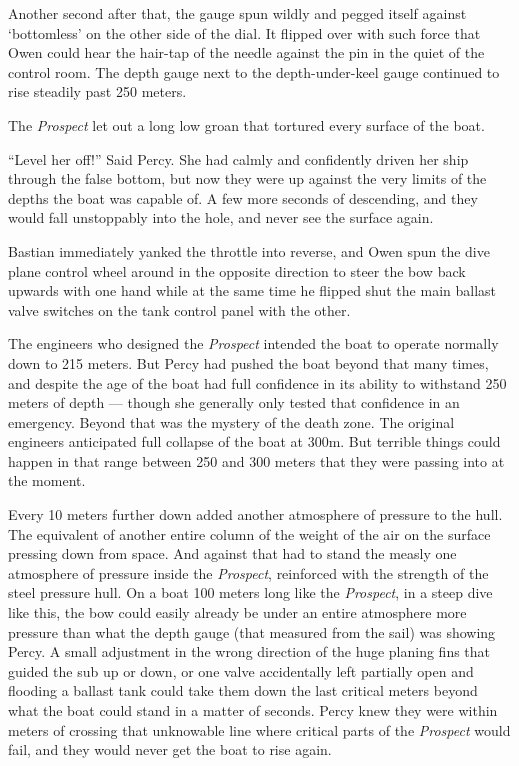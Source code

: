 \documentclass[]{scrbook}
\begin{document}
Another second after that, the gauge spun wildly and pegged itself
against `bottomless' on the other side of the dial. It flipped over with
such force that Owen could hear the hair-tap of the needle against the
pin in the quiet of the control room. The depth gauge next to the
depth-under-keel gauge continued to rise steadily past 250 meters.

The \emph{Prospect} let out a long low groan that tortured every surface
of the boat.

``Level her off!'' Said Percy. She had calmly and confidently driven her
ship through the false bottom, but now they were up against the very
limits of the depths the boat was capable of. A few more seconds of
descending, and they would fall unstoppably into the hole, and never see
the surface again.

Bastian immediately yanked the throttle into reverse, and Owen spun the
dive plane control wheel around in the opposite direction to steer the
bow back upwards with one hand while at the same time he flipped shut
the main ballast valve switches on the tank control panel with the
other.

The engineers who designed the \emph{Prospect} intended the boat to
operate normally down to 215 meters. But Percy had pushed the boat
beyond that many times, and despite the age of the boat had full
confidence in its ability to withstand 250 meters of depth --- though
she generally only tested that confidence in an emergency. Beyond that
was the mystery of the death zone. The original engineers anticipated
full collapse of the boat at 300m. But terrible things could happen in
that range between 250 and 300 meters that they were passing into at the
moment.

Every 10 meters further down added another atmosphere of pressure to the
hull. The equivalent of another entire column of the weight of the air
on the surface pressing down from space. And against that had to stand
the measly one atmosphere of pressure inside the \emph{Prospect},
reinforced with the strength of the steel pressure hull. On a boat 100
meters long like the \emph{Prospect}, in a steep dive like this, the bow
could easily already be under an entire atmosphere more pressure than
what the depth gauge (that measured from the sail) was showing Percy. A
small adjustment in the wrong direction of the huge planing fins that
guided the sub up or down, or one valve accidentally left partially open
and flooding a ballast tank could take them down the last critical
meters beyond what the boat could stand in a matter of seconds. Percy
knew they were within meters of crossing that unknowable line where
critical parts of the \emph{Prospect} would fail, and they would never
get the boat to rise again.
\end{document}
